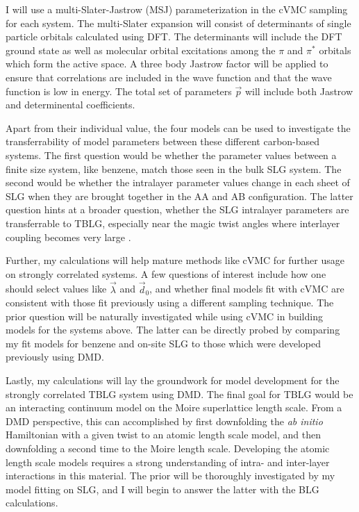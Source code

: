 \documentclass[12pt]{article}
\begin{document}
I will use a multi-Slater-Jastrow (MSJ) parameterization in the cVMC sampling for each system.
The multi-Slater expansion will consist of determinants of single particle orbitals calculated using DFT.
The determinants will include the DFT ground state as well as molecular orbital excitations among the $\pi$ and $\pi^*$ orbitals which form the active space.
A three body Jastrow factor will be applied to ensure that correlations are included in the wave function and that the wave function is low in energy.
The total set of parameters $\vec{p}$ will include both Jastrow and determinental coefficients.

Apart from their individual value, the four models can be used to investigate the transferrability of model parameters between these different carbon-based systems.
The first question would be whether the parameter values between a finite size system, like benzene, match those seen in the bulk SLG system.
The second would be whether the intralayer parameter values change in each sheet of SLG when they are brought together in the AA and AB configuration.
The latter question hints at a broader question, whether the SLG intralayer parameters are transferrable to TBLG, especially near the magic twist angles where interlayer coupling becomes very large \cite{Bistritzer2	011}.

Further, my calculations will help mature methods like cVMC for further usage on strongly correlated systems.
A few questions of interest include how one should select values like $\vec{\lambda}$ and $\vec{d}_0$, and whether final models fit with cVMC are consistent with those fit previously using a different sampling technique.
The prior question will be naturally investigated while using cVMC in building models for the systems above.
The latter can be directly probed by comparing my fit models for benzene and on-site SLG to those which were developed previously using DMD.

Lastly, my calculations will lay the groundwork for model development for the strongly correlated TBLG system using DMD.
The final goal for TBLG would be an interacting continuum model on the Moire superlattice length scale.
From a DMD perspective, this can accomplished by first downfolding the \textit{ab initio} Hamiltonian with a given twist to an atomic length scale model, and then downfolding a second time to the Moire length scale.
Developing the atomic length scale models requires a strong understanding of intra- and inter-layer interactions in this material.
The prior will be thoroughly investigated by my model fitting on SLG, and I will begin to answer the latter with the BLG calculations.
\end{document}
